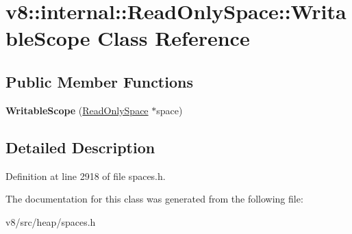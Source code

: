 \hypertarget{classv8_1_1internal_1_1ReadOnlySpace_1_1WritableScope}{}\section{v8\+:\+:internal\+:\+:Read\+Only\+Space\+:\+:Writable\+Scope Class Reference}
\label{classv8_1_1internal_1_1ReadOnlySpace_1_1WritableScope}
\subsection*{Public Member Functions}
\begin{DoxyCompactItemize}
\item 
\mbox{\label{classv8_1_1internal_1_1ReadOnlySpace_1_1WritableScope_a8ad3213ddc80524702ea33350d75e624}} 
{\bfseries Writable\+Scope} (\mbox{\hyperlink{classv8_1_1internal_1_1ReadOnlySpace}{Read\+Only\+Space}} $\ast$space)
\end{DoxyCompactItemize}


\subsection{Detailed Description}


Definition at line 2918 of file spaces.\+h.



The documentation for this class was generated from the following file\+:\begin{DoxyCompactItemize}
\item 
v8/src/heap/spaces.\+h\end{DoxyCompactItemize}
